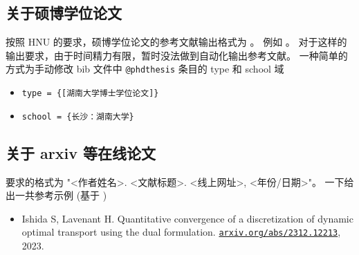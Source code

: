 \subsection*{关于硕博学位论文}

按照 HNU 的要求，硕博学位论文的参考文献输出格式为 。
例如 。
对于这样的输出要求，由于时间精力有限，暂时没法做到自动化输出参考文献。
一种简单的方式为手动修改 bib 文件中 \verb|@phdthesis| 条目的 type 和 school 域
\begin{itemize}
    \item \verb|type = {[湖南大学博士学位论文]}|
    \item \verb|school = {长沙：湖南大学}|
\end{itemize}

\subsection*{关于 arxiv 等在线论文}

要求的格式为 "<作者姓名>. <文献标题>. <线上网址>, <年份/日期>"。
一下给出一共参考示例 (基于 \parencite{ishidaQuantitativeConvergenceDiscretization2023} )

\begin{itemize}
    \item Ishida S, Lavenant H.
    Quantitative convergence of a discretization of dynamic optimal transport using the dual formulation.
    \href{https://arxiv.org/abs/2312.12213}{\nolinkurl {arxiv.org/abs/2312.12213}}, 2023.
\end{itemize}

